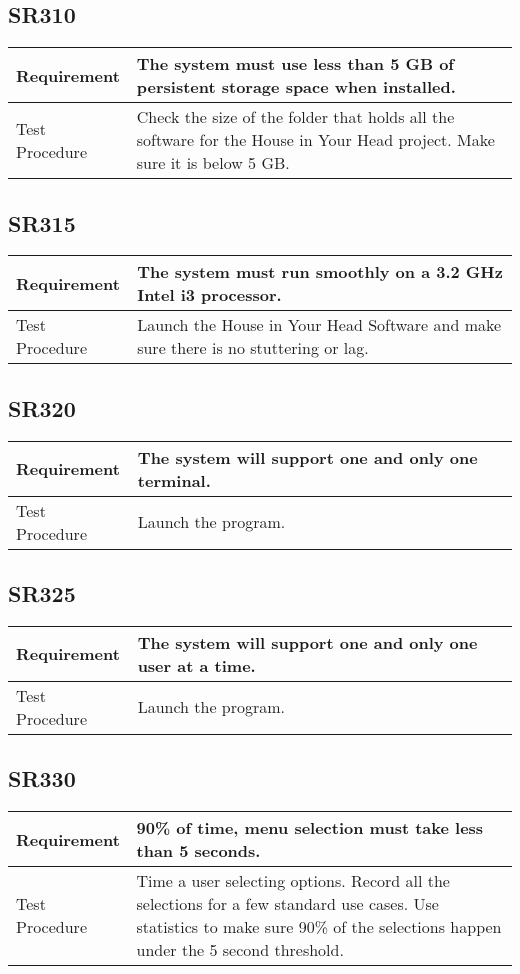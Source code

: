 \documentclass{article}
\begin{document}
\subsection{SR310}
\begin{tabular}{| l | p{12cm}  |}
    \hline
	Requirement & The system must use less than 5 GB of persistent storage space when installed. \\ \hline
	Test Procedure & Check the size of the folder that holds all the software for the House in Your Head project. Make sure it is below 5 GB. \\ \hline
\end{tabular}
\subsection{SR315}
\begin{tabular}{| l | p{12cm}  |}
    \hline
	Requirement & The system must run smoothly on a 3.2 GHz Intel i3 processor. \\ \hline
	Test Procedure & Launch the House in Your Head Software and make sure there is no stuttering or lag. \\ \hline
\end{tabular}
\subsection{SR320}
\begin{tabular}{| l | p{12cm}  |}
    \hline
	Requirement & The system will support one and only one terminal. \\ \hline
	Test Procedure & Launch the program. \\ \hline
\end{tabular}
\subsection{SR325}
\begin{tabular}{| l | p{12cm}  |}
    \hline
	Requirement & The system will support one and only one user at a time. \\ \hline
	Test Procedure & Launch the program. \\ \hline
\end{tabular}
\subsection{SR330}
\begin{tabular}{| l | p{12cm}  |}
    \hline
	Requirement & 90\% of time, menu selection must take less than 5 seconds. \\ \hline
	Test Procedure & Time a user selecting options. Record all the selections for a few standard use cases. Use statistics to make sure 90\% of the selections happen under the 5 second threshold. \\ \hline
\end{tabular}
\end{document}
